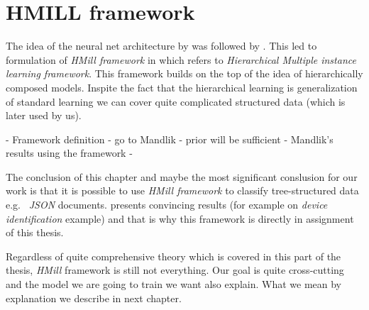 \section{HMILL framework}
The idea of the neural net architecture by  was followed by . This led to formulation of \emph{HMill framework} in \cite{Mandlik2020} which refers to \emph{Hierarchical Multiple instance learning framework}. This framework builds on the top of the idea of hierarchically composed models. Inspite the fact that the hierarchical learning is generalization of standard learning we can cover quite complicated structured data (which is later used by us).

- Framework definition
    - go to Mandlik
- prior will be sufficient
    - Mandlik's results using the framework
    - \cite{PevnyDedic2020}

The conclusion of this chapter and maybe the most significant conslusion for our work is that it is possible to use \emph{HMill framework} to classify tree-structured data e.g. \ \emph{JSON} documents. \citeauthor{Mandlik2020} presents convincing results (for example on \emph{device identification} example) and that is why this framework is directly in assignment of this thesis.

Regardless of quite comprehensive theory which is covered in this part of the thesis, \emph{HMill} framework is still not everything. Our goal is quite cross-cutting and the model we are going to train we want also explain. What we mean by explanation we describe in next chapter.






